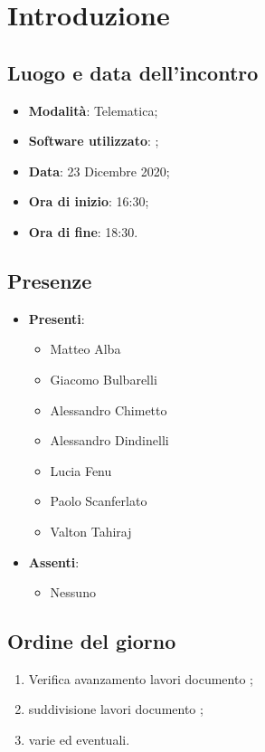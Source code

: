 \documentclass[]{article}
\begin{document}
	
	
	
	\newpage
	
	\section{Introduzione}
		\subsection{Luogo e data dell'incontro}
		\begin{itemize}
			\item \textbf{Modalità}: Telematica;
			\item \textbf{Software utilizzato}: ;
			\item \textbf{Data}: 23 Dicembre 2020;
			\item \textbf{Ora di inizio}: 16:30;
			\item \textbf{Ora di fine}: 18:30.
		\end{itemize}

		\subsection{Presenze}
		\begin{itemize}
			\item \textbf{Presenti}:
		\begin{itemize}
			\item Matteo Alba
			\item Giacomo Bulbarelli
			\item Alessandro Chimetto
			\item Alessandro Dindinelli
			\item Lucia Fenu
			\item Paolo Scanferlato
			\item Valton Tahiraj
		\end{itemize}
			\item \textbf{Assenti}:
			\begin{itemize}
				\item Nessuno
			\end{itemize}
		\end{itemize}
	
		\subsection{Ordine del giorno}
		\begin{enumerate}
			\item Verifica avanzamento lavori documento ;
			\item suddivisione lavori documento ;
			\item varie ed eventuali.
		\end{enumerate}
	
\end{document}
